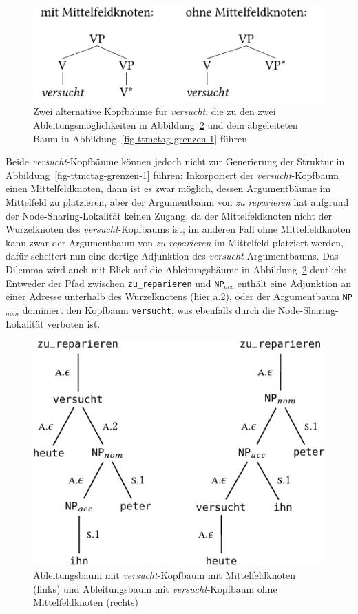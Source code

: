 \begin{figure}[t]
\centering
\includegraphics{graphics/abb728.pdf}
\caption{\label{fig-ttmctag-grenzen-2}Zwei alternative Kopfbäume für {\it versucht}, die zu den zwei Ableitungsmöglichkeiten in Abbildung~\ref{fig-ttmctag-grenzen-2-b} und dem abgeleiteten Baum in Abbildung~\ref{fig-ttmctag-grenzen-1} führen}
\end{figure} 
Beide {\it versucht}-Kopfbäume können jedoch nicht zur Generierung der Struktur in Abbildung~\ref{fig-ttmctag-grenzen-1} führen: Inkorporiert der {\it versucht}-Kopfbaum einen Mittelfeldknoten, dann ist es zwar möglich, dessen Argumentbäume im Mittelfeld zu platzieren, aber der Argumentbaum von {\it zu reparieren} hat aufgrund der Node-Sharing-Lokalität keinen Zugang, da der Mittelfeldknoten nicht der Wurzelknoten des {\it versucht}-Kopfbaums ist; im anderen Fall ohne Mittelfeldknoten kann zwar der Argumentbaum von {\it zu reparieren} im Mittelfeld platziert werden, dafür scheitert nun eine dortige Adjunktion des {\it versucht}-Argumentbaums. Das Dilemma wird auch mit Blick auf die Ableitungsbäume in Abbildung~\ref{fig-ttmctag-grenzen-2-b} deutlich: Entweder der Pfad zwischen {\tt zu\_reparieren} und {\tt NP$_{acc}$} enthält eine Adjunktion an einer Adresse unterhalb des Wurzelknotens (hier {\sc a.2}), oder der Argumentbaum {\tt NP$_{nom}$} dominiert den Kopfbaum {\tt versucht}, was ebenfalls durch die Node-Sharing-Lokalität verboten ist. 
\begin{figure}[t]
\centering
\includegraphics{graphics/abb729.pdf}
\caption{\label{fig-ttmctag-grenzen-2-b}Ableitungsbaum mit {\it versucht}-Kopfbaum mit Mittelfeldknoten (links) und Ableitungsbaum mit {\it versucht}-Kopfbaum ohne Mittelfeldknoten (rechts)}
\end{figure} 

